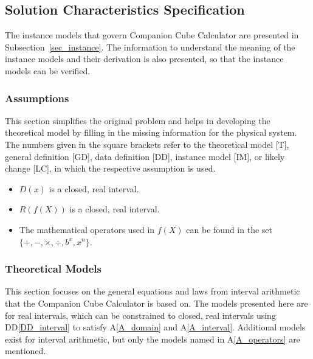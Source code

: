 \documentclass[12pt]{article}
\newcommand{\ddref}[1]{DD\ref{#1}}
\newcounter{assumpnum} %
\newcommand{\aref}[1]{A\ref{#1}}
\newcommand{\progname}{Companion Cube Calculator} %
\begin{document}
\subsection{Solution Characteristics Specification}
The instance models that govern \progname{} are presented in
Subsection~\ref{sec_instance}. The information to understand the meaning of the
instance models and their derivation is also presented, so that the instance
models can be verified.

\subsubsection{Assumptions}
This section simplifies the original problem and helps in developing the
theoretical model by filling in the missing information for the physical
system. The numbers given in the square brackets refer to the theoretical model
[T], general definition [GD], data definition [DD], instance model [IM], or
likely change [LC], in which the respective assumption is used.

\begin{itemize}

\item[A\refstepcounter{assumpnum}\theassumpnum \label{A_domain}:] $D(x)$ is a 
closed, real interval. 

\item[A\refstepcounter{assumpnum}\theassumpnum \label{A_interval}:] $R(f(X))$ 
is a closed, real interval.

\item[A\refstepcounter{assumpnum}\theassumpnum \label{A_operators}:] The 
mathematical operators used in $f(X)$ can be found in the set $\{+, -, 
\times, \div, b^x, x^n \}$.

\end{itemize}

\subsubsection{Theoretical Models}\label{sec_theoretical}

This section focuses on the general equations and laws from interval arithmetic 
that the \progname{} is based on. The models presented here are for real 
intervals, which can be constrained to closed, real intervals using 
\ddref{DD_interval} to satisfy \aref{A_domain} and \aref{A_interval}. 
Additional models exist for interval arithmetic, but only the models named in 
\aref{A_operators} are mentioned.
\end{document}
